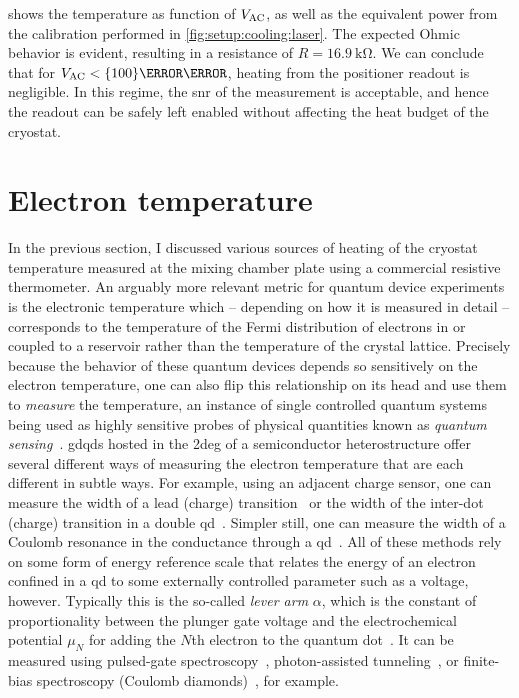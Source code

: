  shows the temperature as function of $V_{\mathrm{AC}}$, as well as the equivalent power from the calibration performed in \cref{fig:setup:cooling:laser}.
The expected Ohmic behavior is evident, resulting in a resistance of $R=\qty{16.9}{\kilo\ohm}$.
We can conclude that for $V_{\mr{AC}} < \qty{100}{\milli\volt}$, heating from the positioner readout is negligible.
In this regime, the \gls{snr} of the measurement is acceptable, and hence the readout can be safely left enabled without affecting the heat budget of the cryostat.

\section{Electron temperature}\label{sec:setup:cooling:etemp}
In the previous section, I discussed various sources of heating of the cryostat temperature measured at the mixing chamber plate using a commercial resistive thermometer.
An arguably more relevant metric for quantum device experiments is the electronic temperature which -- depending on how it is measured in detail -- corresponds to the temperature of the Fermi distribution of electrons in or coupled to a reservoir rather than the temperature of the crystal lattice.
Precisely because the behavior of these quantum devices depends so sensitively on the electron temperature, one can also flip this relationship on its head and use them to \emph{measure} the temperature, an instance of single controlled quantum systems being used as highly sensitive probes of physical quantities known as \emph{quantum sensing}~\cite{Degen2017}.
\Glspl{gdqd} hosted in the \gls{2deg} of a semiconductor heterostructure offer several different ways of measuring the electron temperature that are each different in subtle ways.
For example, using an adjacent charge sensor, one can measure the width of a lead
(charge) transition~\cite{Maradan2014} or the width of the inter-dot (charge) transition in a double \gls{qd}~\cite{DiCarlo2004}.
Simpler still, one can measure the width of a Coulomb resonance in the conductance through a \gls{qd}~\cite{Ihn2009,Maradan2014}.
All of these methods rely on some form of energy reference scale that relates the energy of an electron confined in a \gls{qd} to some externally controlled parameter such as a voltage, however.
Typically this is the so-called \emph{lever arm} $\alpha$, which is the constant of proportionality between the plunger gate voltage and the electrochemical potential $\mu_N$ for adding the $N$th electron to the quantum dot~\cite{Ihn2009}.
It can be measured using pulsed-gate spectroscopy~\cite{Fujisawa2001,Harbusch2010}, photon-assisted tunneling~\cite{Kouwenhoven1994}, or finite-bias spectroscopy (Coulomb diamonds)~\cite{Kouwenhoven2001,Ihn2009}, for example.

